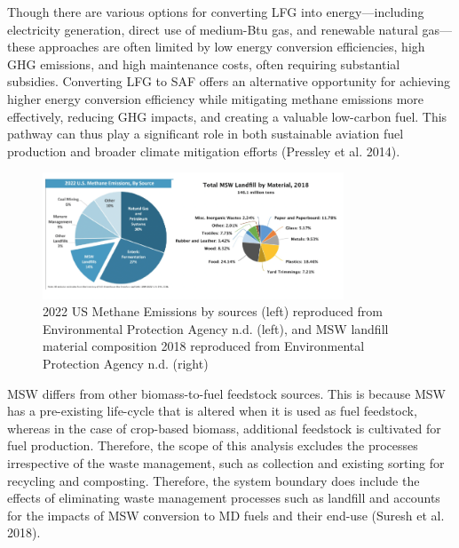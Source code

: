 \documentclass[12pt]{article}
\begin{document}
\begin{Appendix}
Though there are various options for converting LFG into energy—including electricity generation, direct use of medium-Btu gas, and renewable natural gas—these approaches are often limited by low energy conversion efficiencies, high GHG emissions, and high maintenance costs, often requiring substantial subsidies. Converting LFG to SAF offers an alternative opportunity for achieving higher energy conversion efficiency while mitigating methane emissions more effectively, reducing GHG impacts, and creating a valuable low-carbon fuel. This pathway can thus play a significant role in both sustainable aviation fuel production and broader climate mitigation efforts (Pressley et al. 2014). 

\begin{figure}[H]
\centering
\includegraphics[width=0.8\textwidth]{Fig 8.png} %
\caption{2022 US Methane Emissions by sources (left) reproduced from Environmental Protection Agency n.d. (left), and MSW landfill material composition 2018 reproduced from Environmental Protection Agency n.d. (right)}
\label{figure8}
\end{figure}

MSW diﬀers from other biomass-to-fuel feedstock sources. This is because MSW has a pre-existing life-cycle that is altered when it is used as fuel feedstock, whereas in the case of crop-based biomass, additional feedstock is cultivated for fuel production. Therefore, the scope of this analysis excludes the processes irrespective of the waste management, such as collection and existing sorting for recycling and composting. Therefore, the system boundary does include the eﬀects of eliminating waste management processes such as landﬁll and accounts for the impacts of MSW conversion to MD fuels and their end-use (Suresh et al. 2018).


\end{Appendix}
\end{document}
